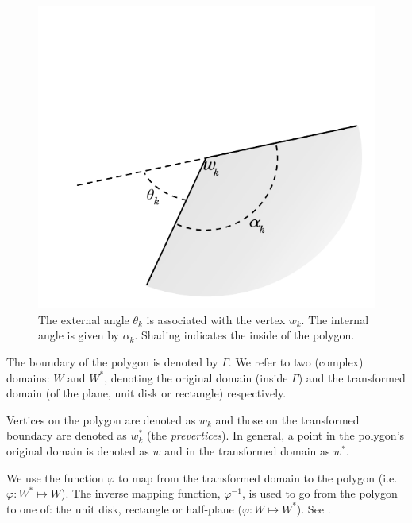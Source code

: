 \begin{figure} [t]
\centering
\includegraphics[scale=0.6]{sc/figs/anglediagram.pdf}
\caption{The external angle $\theta_k$ is associated with the vertex $w_k$. The internal angle is given by $\alpha_k$. Shading indicates the inside of the polygon.}
\label{anglediagram}
\end{figure}

The boundary of the polygon is denoted by $\Gamma$. We refer to two (complex) domains: $W$ and $W^*$, denoting the original domain (inside $\Gamma$) and the transformed domain (of the plane, unit disk or rectangle) respectively. 

Vertices on the polygon are denoted as $w_k$ and those on the transformed boundary are denoted as $w^*_k$ (the \emph{prevertices}). In general, a point in the polygon's original domain is denoted as $w$ and in the transformed domain as $w^*$.

We use the function $\varphi$ to map from the transformed domain to the polygon (i.e. $\varphi:W^* \mapsto W$). The inverse mapping function, $\varphi^{-1}$, is used to go from the polygon to one of: the unit disk, rectangle or half-plane ($\varphi:W \mapsto W^*$).  See .

